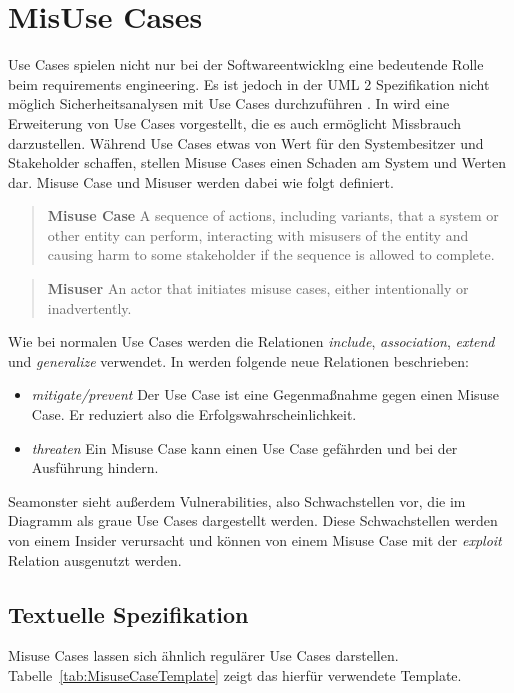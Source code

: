 \section{MisUse Cases}

Use Cases spielen nicht nur bei der Softwareentwicklng eine bedeutende Rolle beim requirements engineering. Es ist jedoch in der UML 2 Spezifikation nicht möglich Sicherheitsanalysen mit Use Cases durchzuführen \cite{sindre2005eliciting}. 
In \cite{sindre2005eliciting} wird eine Erweiterung von Use Cases vorgestellt, die es auch ermöglicht Missbrauch darzustellen. Während Use Cases etwas von Wert für den Systembesitzer und Stakeholder schaffen, stellen Misuse Cases einen Schaden am System und Werten dar.
Misuse Case und Misuser werden dabei wie folgt definiert.
\begin{quote}
\textbf{Misuse Case} A sequence of actions, including variants, that a system or other entity can perform, interacting with misusers of the entity and causing harm to some stakeholder if the sequence is allowed to complete. \cite{sindre2005eliciting}
\end{quote}

\begin{quote}
\textbf{Misuser} An actor that initiates misuse cases, either intentionally or inadvertently. \cite{sindre2005eliciting}
\end{quote}

Wie bei normalen Use Cases werden die Relationen \textit{include}, \textit{association}, \textit{extend} und \textit{generalize} verwendet.
In \cite{sindre2005eliciting} werden folgende neue Relationen beschrieben:
\begin{itemize}
\item \textit{mitigate/prevent} Der Use Case ist eine Gegenmaßnahme gegen einen Misuse Case. Er reduziert also die Erfolgswahrscheinlichkeit.
\item \textit{threaten} Ein Misuse Case kann einen Use Case gefährden und bei der Ausführung hindern.
\end{itemize}

Seamonster sieht außerdem Vulnerabilities, also Schwachstellen vor, die im Diagramm als graue Use Cases dargestellt werden. Diese Schwachstellen werden von einem Insider verursacht und können von einem Misuse Case mit der \textit{exploit} Relation ausgenutzt werden.

\subsection{Textuelle Spezifikation}
Misuse Cases lassen sich ähnlich regulärer Use Cases darstellen. Tabelle~\ref{tab:MisuseCaseTemplate} zeigt das hierfür verwendete Template. 

